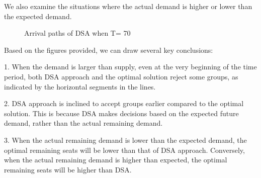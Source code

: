 We also examine the situations where the actual demand is higher or lower than the expected demand.

\begin{figure}[h]
  \centering
  \caption{Arrival paths of DSA when T= 70}
\end{figure}

Based on the figures provided, we can draw several key conclusions:

1. When the demand is larger than supply, even at the very beginning of the time period, both DSA approach and the optimal solution reject some groups, as indicated by the horizontal segments in the lines.

2. DSA approach is inclined to accept groups earlier compared to the optimal solution. This is because DSA makes decisions based on the expected future demand, rather than the actual remaining demand.

3. When the actual remaining demand is lower than the expected demand, the optimal remaining seats will be lower than that of DSA approach. Conversely, when the actual remaining demand is higher than expected, the optimal remaining seats will be higher than DSA.


